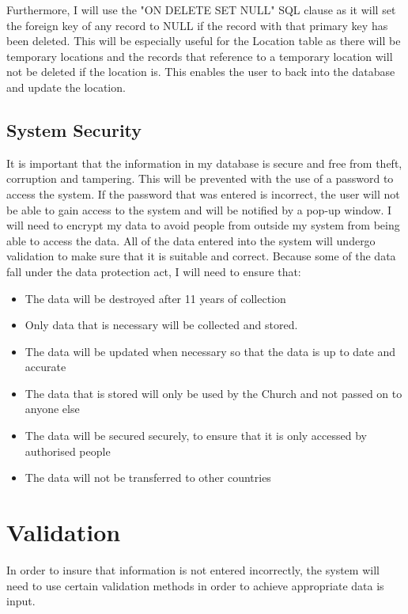 \noindent Furthermore, I will use the "ON DELETE SET NULL" SQL clause as it will set the foreign key of any record to NULL if the record with that primary key has been deleted. This will be especially useful for the Location table as there will be temporary locations and the records that reference to a temporary location will not be deleted if the location is. This enables the user to back into the database and update the location.

\subsection{System Security}

It is important that the information in my database is secure and free from theft, corruption and tampering. This will be prevented with the use of a password to access the system. If the password that was entered is incorrect, the user will not be able to gain access to the system and will be notified by a pop-up window. I will need to encrypt my data to avoid people from outside my system from being able to access the data. All of the data entered into the system will undergo validation to make sure that it is suitable and correct.
Because some of the data fall under the data protection act, I will need to ensure that:
\begin{itemize}
    \item The data will be destroyed after 11 years of collection
    \item Only data that is necessary will be collected and stored.
    \item The data will be updated when necessary so that the data is up to date and accurate
    \item The data that is stored will only be used by the Church and not passed on to anyone else
    \item The data will be secured securely, to ensure that it is only accessed by authorised people
    \item The data will not be transferred to other countries
\end{itemize}


\section{Validation}

In order to insure that information is not entered incorrectly, the system will need to use certain validation methods in order to achieve appropriate data is input.

